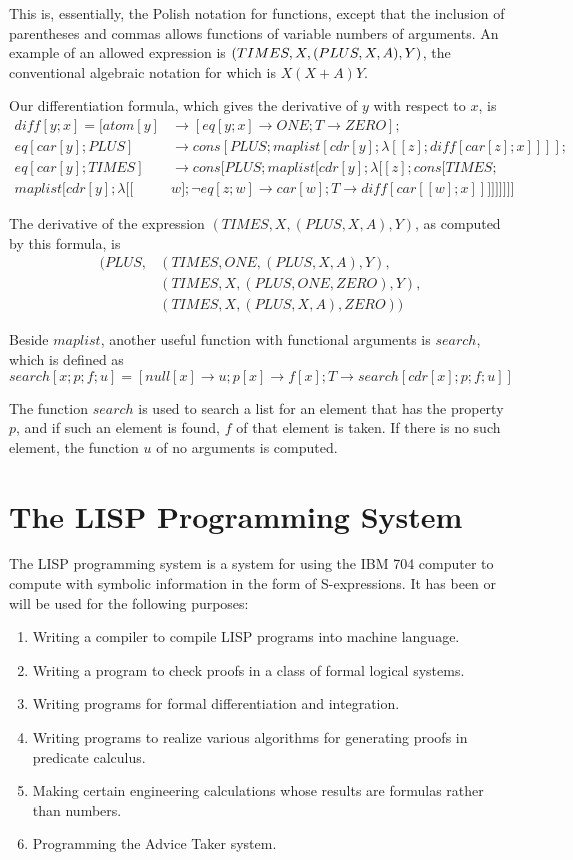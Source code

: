 \documentclass[11pt, a4paper]{article}
\begin{document}
This is, essentially, the Polish notation for functions, except that the
inclusion of parentheses and commas allows functions of variable numbers of
arguments. An example of an allowed expression is $(TIMES, X, (PLUS, X,
A),\\Y)$, the conventional algebraic notation for which is $X(X + A)Y$.

Our differentiation formula, which gives the derivative of $y$ with respect to
$x$, is
\begin{align*}
  diff[y; x] = [atom[y] &\to [eq[y; x] \to ONE; T \to ZERO];                  \\
    eq[car[y]; PLUS] &\to cons[PLUS; maplist[cdr[y]; \lambda[[z]; diff[car[z];
            x]]]];                                                            \\
    eq[car[y]; TIMES] &\to cons[PLUS; maplist[cdr[y]; \lambda[[z]; cons[TIMES;\\
maplist[cdr[y]; \lambda[[&w]; \lnot eq[z; w] \to car[w]; T \to diff[car[[w];
        x]]]]]]]]]
\end{align*}

The derivative of the expression $(TIMES, X, (PLUS, X, A), Y)$, as computed by
this formula, is
\begin{align*}
(PLUS, &(TIMES, ONE, (PLUS, X, A), Y),    \\
       &(TIMES, X, (PLUS, ONE, ZERO), Y), \\
       &(TIMES, X, (PLUS, X, A), ZERO))
\end{align*}

Beside $maplist$, another useful function with functional arguments is $search$,
which is defined as
$$ search[x; p; f; u] = [null[x] \to u; p[x] \to f[x]; T \to search[cdr[x]; p;
    f; u]] $$

The function $search$ is used to search a list for an element that has the
property $p$, and if such an element is found, $f$ of that element is taken. If
there is no such element, the function $u$ of no arguments is computed.

\section{The LISP Programming System}

The LISP programming system is a system for using the IBM 704 computer to
compute with symbolic information in the form of S-expressions. It has been or
will be used for the following purposes:
\begin{enumerate}
\item Writing a compiler to compile LISP programs into machine language.
\item Writing a program to check proofs in a class of formal logical systems.
\item Writing programs for formal differentiation and integration.
\item Writing programs to realize various algorithms for generating proofs in
  predicate calculus.
\item Making certain engineering calculations whose results are formulas rather
  than numbers.
\item Programming the Advice Taker system.
\end{enumerate}
\end{document}
